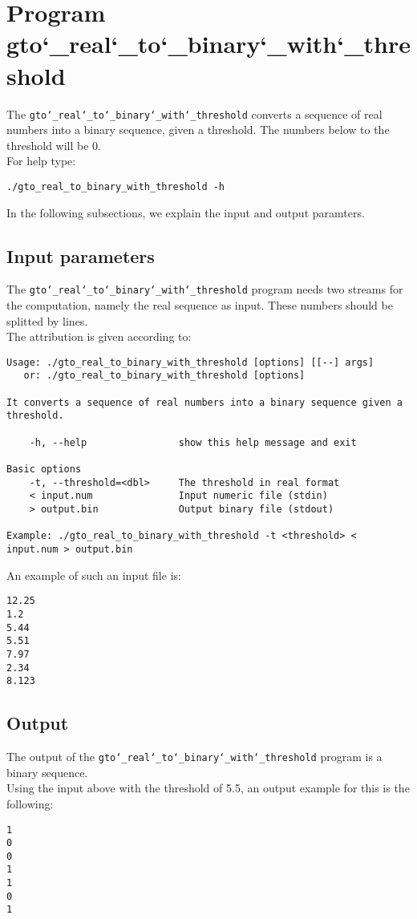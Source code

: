 \section{Program gto\char`_real\char`_to\char`_binary\char`_with\char`_threshold}
The \texttt{gto\char`_real\char`_to\char`_binary\char`_with\char`_threshold} converts a sequence of real numbers into a binary sequence, given a threshold. The numbers below to the threshold will be 0.\\
For help type:
\begin{lstlisting}
./gto_real_to_binary_with_threshold -h
\end{lstlisting}
In the following subsections, we explain the input and output paramters.

\subsection*{Input parameters}

The \texttt{gto\char`_real\char`_to\char`_binary\char`_with\char`_threshold} program needs two streams for the computation, namely the real sequence as input. These numbers should be splitted by lines.\\
The attribution is given according to:
\begin{lstlisting}
Usage: ./gto_real_to_binary_with_threshold [options] [[--] args]
   or: ./gto_real_to_binary_with_threshold [options]

It converts a sequence of real numbers into a binary sequence given a threshold.

    -h, --help                show this help message and exit

Basic options
    -t, --threshold=<dbl>     The threshold in real format
    < input.num               Input numeric file (stdin)
    > output.bin              Output binary file (stdout)

Example: ./gto_real_to_binary_with_threshold -t <threshold> < input.num > output.bin
\end{lstlisting}
An example of such an input file is:
\begin{lstlisting}
12.25
1.2
5.44
5.51
7.97
2.34
8.123
\end{lstlisting}

\subsection*{Output}
The output of the \texttt{gto\char`_real\char`_to\char`_binary\char`_with\char`_threshold} program is a binary sequence.\\
Using the input above with the threshold of 5.5, an output example for this is the following:
\begin{lstlisting}
1
0
0
1
1
0
1
\end{lstlisting}